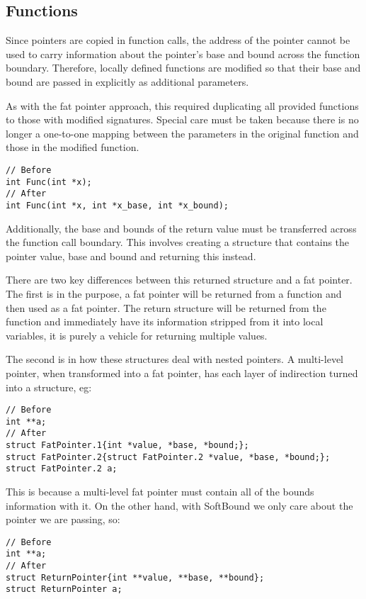 \subsection{Functions}

Since pointers are copied in function calls, the address of the pointer cannot be used to carry information about the pointer's base and bound across the function boundary.
Therefore, locally defined functions are modified so that their base and bound are passed in explicitly as additional parameters.

As with the fat pointer approach, this required duplicating all provided functions to those with modified signatures.
Special care must be taken because there is no longer a one-to-one mapping between the parameters in the original function and those in the modified function.

\begin{verbatim}
// Before
int Func(int *x);
// After
int Func(int *x, int *x_base, int *x_bound);
\end{verbatim}

Additionally, the base and bounds of the return value must be transferred across the function call boundary.
This involves creating a structure that contains the pointer value, base and bound and returning this instead.

There are two key differences between this returned structure and a fat pointer.
The first is in the purpose, a fat pointer will be returned from a function and then used as a fat pointer.
The return structure will be returned from the function and immediately have its information stripped from it into local variables, it is purely a vehicle for returning multiple values.

The second is in how these structures deal with nested pointers.
A multi-level pointer, when transformed into a fat pointer, has each layer of indirection turned into a structure, eg:

\begin{verbatim}
// Before
int **a;
// After
struct FatPointer.1{int *value, *base, *bound;};
struct FatPointer.2{struct FatPointer.2 *value, *base, *bound;};
struct FatPointer.2 a;
\end{verbatim}

This is because a multi-level fat pointer must contain all of the bounds information with it.
On the other hand, with SoftBound we only care about the pointer we are passing, so:

\begin{verbatim}
// Before
int **a;
// After
struct ReturnPointer{int **value, **base, **bound};
struct ReturnPointer a;
\end{verbatim}

